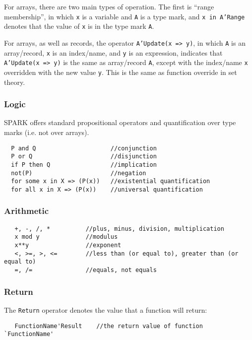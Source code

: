 For arrays, there are two main types of operation. The first is ``range membership'', in which  \texttt{x} is a variable and \texttt{A} is a type mark, and \texttt{x in A'Range} denotes that the value of \texttt{x} is in the type mark \texttt{A}.

For arrays, as well as records, the operator \texttt{A'Update(x => y)}, in which \texttt{A} is an array/record, \texttt{x} is an index/name, and \texttt{y} is an expression, indicates that \texttt{A'Update(x => y)} is the same as array/record \texttt{A}, except with the index/name \texttt{x} overridden with the new value \texttt{y}. This is the same as function override in set theory.


\subsubsection{Logic}

SPARK offers standard propositional operators and quantification over type marks (i.e. not over arrays).

\lstset{language=}
\lstset{aboveskip=3mm}
\begin{lstlisting}
  P and Q                     //conjunction
  P or Q                      //disjunction
  if P then Q                 //implication
  not(P)                      //negation
  for some x in X => (P(x))   //existential quantification
  for all x in X => (P(x))    //universal quantification
\end{lstlisting}

\subsubsection{Arithmetic}

\lstset{language=}
\begin{lstlisting}
   +, -, /, *          //plus, minus, division, multiplication
   x mod y             //modulus
   x**y                //exponent
   <, >=, >, <=        //less than (or equal to), greater than (or equal to)
   =, /=               //equals, not equals
\end{lstlisting}

\subsubsection{Return}

The \texttt{Return} operator denotes the value that a function will return:

\lstset{language=}
\begin{lstlisting}
   FunctionName'Result    //the return value of function `FunctionName'
\end{lstlisting}

